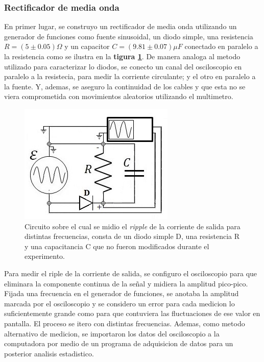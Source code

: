 \documentclass[11pt,a4paper]{article}
\begin{document}
\subsubsection{Rectificador de media onda}
En primer lugar, se construyo un rectificador de media onda utilizando un generador de funciones como fuente sinusoidal, un diodo simple, una resistencia $R = (5 \pm 0.05)\Omega$ y un capacitor $C = (9.81 \pm 0.07)\mu F$ conectado en paralelo a la resistencia como se ilustra en la \textbf{tigura \ref{fig:Re-M-O}}. De manera analoga al metodo utilizado para caracterizar lo diodos, se conecto un canal del osciloscopio en paralelo a la resistecia, para medir la corriente circulante; y el otro en paralelo a la fuente. Y, ademas, se aseguro la continuidad de los cables y que esta no se viera comprometida con movimientos aleatorios utilizando el multimetro.

\begin{figure}[H]
\centering
\includegraphics[scale=0.8]{Rectificador-Media-Onda}
   \caption{Circuito sobre el cual se midio el \textit{ripple} de la corriente de salida para distintas frecuencias, consta de un diodo simple D, una resistencia R y una capacitancia C que no fueron modificados durante el experimento. }
   \label{fig:Re-M-O}
\end{figure}

Para medir el riple de la corriente de salida, se configuro el osciloscopio para que eliminara la componente continua de la señal y midiera la amplitud pico-pico. Fijada una frecuencia en el generador de funciones, se anotaba la amplitud marcada por el osciloscopio y se considero un error para cada medicion lo suficientemente grande como para que contuviera las fluctuaciones de ese valor en pantalla. El proceso se itero con distintas frecuencias.  Ademas, como metodo alternativo de medicion, se importaron los datos del osciloscopio a la computadora por medio de un programa de adquisicion de datos para un posterior analisis estadistico.
\end{document}
